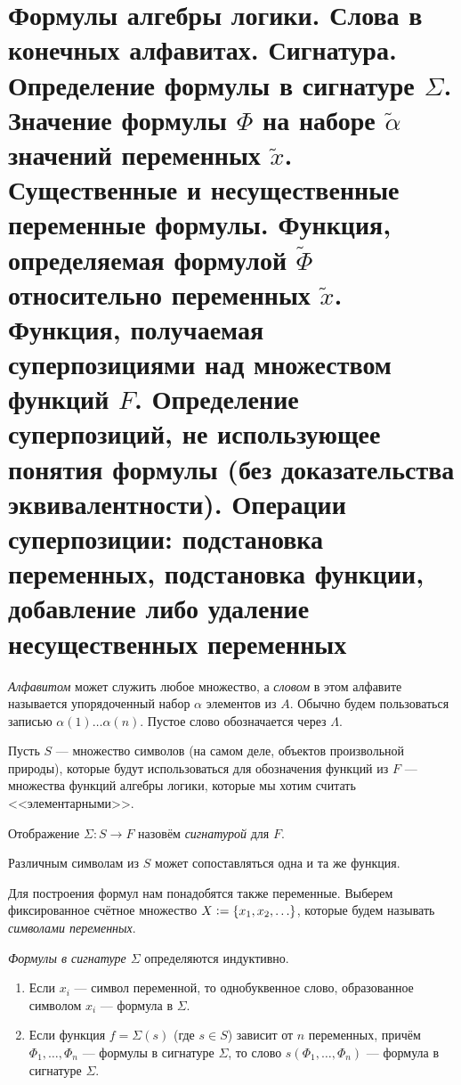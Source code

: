\section{Формулы алгебры логики. Слова в конечных алфавитах. Сигнатура. Определение формулы в сигнатуре $\Sigma$. Значение формулы $\Phi$ на наборе $\widetilde{\alpha}$ значений переменных $\widetilde{x}$. Существенные и несущественные переменные формулы. Функция, определяемая формулой $\widetilde{\Phi}$ относительно переменных $\widetilde{x}$. Функция, получаемая суперпозициями над множеством функций $F$. Определение суперпозиций, не использующее понятия формулы (без доказательства эквивалентности). Операции суперпозиции: подстановка переменных, подстановка функции, добавление либо удаление несущественных переменных}

\begin{definition}
    \textit{Алфавитом} может служить любое множество, а \textit{словом} в этом алфавите называется упорядоченный набор $\alpha$ элементов из $A$. Обычно будем пользоваться записью $\alpha(1)\ldots\alpha(n)$. Пустое слово обозначается через $\Lambda$.
\end{definition}

Пусть $S$ --- множество символов (на самом деле, объектов произвольной природы), которые будут использоваться для обозначения функций из $F$ --- множества функций алгебры логики, которые мы хотим считать <<элементарными>>.

\begin{definition}
    Отображение $\Sigma : S \to F$ назовём \textit{сигнатурой} для $F$.
\end{definition}

\begin{remark}
    Различным символам из $S$ может сопоставляться одна и та же функция.
\end{remark}

Для построения формул нам понадобятся также переменные. Выберем фиксированное счётное множество $X \vcentcolon = \{x_1, x_2, \ldots\}$, которые будем называть \textit{символами переменных}.

\begin{definition}
    \textit{Формулы в сигнатуре $\Sigma$} определяются индуктивно.
    \begin{enumerate}
        \item Если $x_i$ --- символ переменной, то однобуквенное слово, образованное символом $x_i$ --- формула в $\Sigma$.
        \item Если функция $f = \Sigma(s)$ (где $s \in S$) зависит от $n$ переменных, причём $\Phi_1, \ldots, \Phi_n$ --- формулы в сигнатуре $\Sigma$, то слово $s(\Phi_1, \ldots, \Phi_n)$ --- формула в сигнатуре $\Sigma$.
    \end{enumerate}
\end{definition}

